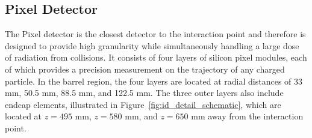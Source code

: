 

\subsection{Pixel Detector}
\label{sec:pixel}
The Pixel detector is the closest detector to the interaction point and therefore is designed to provide high granularity while simultaneously handling a large dose of radiation from collisions.
It consists of four layers of silicon pixel modules, each of which provides a precision measurement on the trajectory of any charged particle.
In the barrel region, the four layers are located at radial distances of 33 mm, 50.5 mm, 88.5 mm, and 122.5 mm. 
The three outer layers also include endcap elements, illustrated in Figure~\ref{fig:id_detail_schematic}, which are located at $z=495$ mm, $z=580$ mm, and $z=650$ mm away from the interaction point. 

